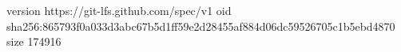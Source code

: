 version https://git-lfs.github.com/spec/v1
oid sha256:865793f0a033d3abc67b5d1ff59e2d28455af884d06dc59526705c1b5ebd4870
size 174916
